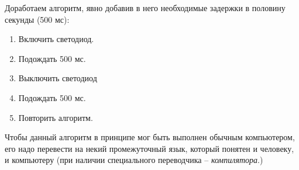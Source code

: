 \documentclass[../sparc.tex]{subfiles}
\begin{document}
Доработаем алгоритм, явно добавив в него необходимые задержки в половину секунды
(500 мс):
\begin{enumerate}
\item Включить светодиод.
\item Подождать 500 мс.
\item Выключить светодиод
\item Подождать 500 мс.
\item Повторить алгоритм.
\end{enumerate}

Чтобы данный алгоритм в принципе мог быть выполнен обычным компьютером, его надо
перевести на некий промежуточный язык, который понятен и человеку, и компьютеру
(при наличии специального переводчика -- \emph{компилятора}.)
\end{document}
